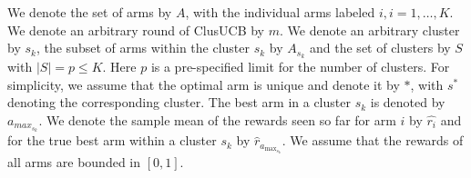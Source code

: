 We denote the set of arms by $A$, with the individual arms labeled $i, i=1,\ldots,K$.
We denote an arbitrary round of ClusUCB by $m$. We denote an arbitrary cluster by $s_{k}$, the subset of arms within the cluster $s_k$ by  $A_{s_{k}}$ and the set of clusters by $S$ with $|S|=p\leq K$. 
Here $p$ is a pre-specified limit for the number of clusters.
For simplicity, we assume that the optimal arm is unique and denote it by ${*}$, with $s^{*}$ denoting the corresponding cluster.
The best arm in a cluster $s_{k}$ is denoted by $a_{max_{s_{k}}}$.  
We denote the sample mean of the rewards seen so far for arm $i$ by $\widehat{r_i}$ and for the true best arm within a cluster $s_k$ by $\hat{r}_{a_{\max_{s_{k}}}}$. 
We assume that the rewards of all arms are bounded in $[0,1]$.


